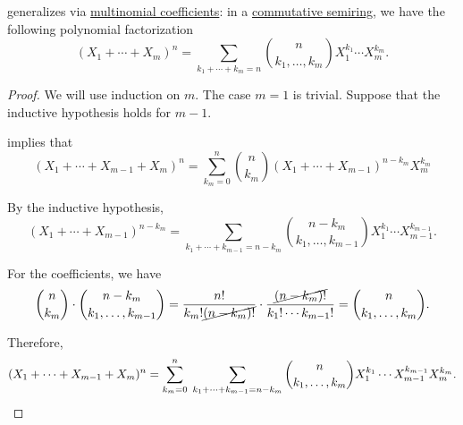 \begin{theorem}\label{thm:multinomial_theorem}
   generalizes via \hyperref[def:multinomial_coefficient]{multinomial coefficients}: in a \hyperref[def:semiring/commutative]{commutative semiring}, we have the following polynomial factorization
  \begin{equation}\label{eq:thm:multinomial_theorem}
    (X_1 + \cdots + X_m)^n = \sum_{k_1 + \cdots + k_m = n} \binom n {k_1,\ldots,k_m} X_1^{k_1} \cdots X_m^{k_m}.
  \end{equation}
\end{theorem}
\begin{proof}
  We will use induction on \( m \). The case \( m = 1 \) is trivial. Suppose that the inductive hypothesis holds for \( m - 1 \).

   implies that
  \begin{equation*}
    (X_1 + \cdots + X_{m-1} + X_m)^n
    =
    \sum_{k_m=0}^n \binom n {k_m} (X_1 + \cdots + X_{m-1})^{n - k_m} X_m^{k_m}
  \end{equation*}

  By the inductive hypothesis,
  \begin{equation*}
    (X_1 + \cdots + X_{m-1})^{n - k_m}
    =
    \sum_{k_1 + \cdots + k_{m-1} = n - k_m} \binom {n - k_m} {k_1,\ldots,k_{m-1}} X_1^{k_1} \cdots X_{m-1}^{k_{m-1}}.
  \end{equation*}

  For the coefficients, we have
  \begin{equation*}
    \binom n {k_m} \cdot \binom {n - k_m} {k_1,\ldots,k_{m-1}}
    =
    \frac {n!} {k_m! \cancel{(n - k_m)!}} \cdot \frac {\cancel{(n - k_m)!}} {k_1! \cdots k_{m-1}!}
    =
    \binom n {k_1,\ldots,k_m}.
  \end{equation*}

  Therefore,
  \begin{equation*}
    (X_1 + \cdots + X_{m-1} + X_m)^n
    =
    \sum_{k_m=0}^n \thickspace \sum_{k_1 + \cdots + k_{m-1} = n - k_m} \binom n {k_1,\ldots,k_m} X_1^{k_1} \cdots X_{m-1}^{k_{m-1}} X_m^{k_m}.
  \end{equation*}
\end{proof}
